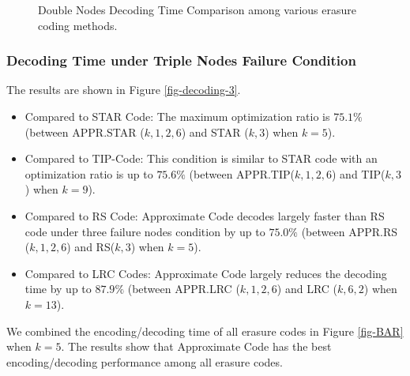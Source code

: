 \documentclass[sigconf]{acmart}
\begin{document}
\begin{figure}[ht]

\caption{Double Nodes Decoding Time Comparison among various erasure coding methods.}\label{fig-decoding-2}
\end{figure}


\subsubsection{Decoding Time under Triple Nodes Failure Condition}
The results are shown in Figure \ref{fig-decoding-3}.
\begin{itemize}
    \item Compared to STAR Code: The maximum optimization ratio is $75.1\%$ (between APPR.STAR ($k,1,2,6$) and STAR ($k,3$) when $k = 5$).
    \item Compared to TIP-Code: This condition is similar to STAR code with an optimization ratio is up to $75.6\%$ (between APPR.TIP($k,1,2,6$) and TIP($k,3$) when $k = 9$).
    \item Compared to RS Code: Approximate Code decodes largely faster than RS code under three failure nodes condition by up to $75.0\%$ (between APPR.RS ($k,1,2,6$) and RS($k,3$) when $k = 5$).
    \item Compared to LRC Codes: Approximate Code largely reduces the decoding time  by up to $87.9\%$  (between APPR.LRC ($k,1,2,6$) and LRC ($k, 6, 2$) when $k = 13$).
\end{itemize}

We combined the encoding/decoding time of all erasure codes in Figure \ref{fig-BAR} when $k=5$. The results show that Approximate Code has the best encoding/decoding performance among all erasure codes. 
\end{document}
